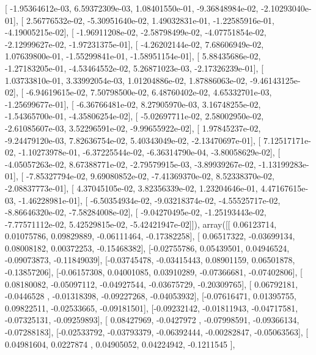 \documentclass{article}
\begin{document}
       [ -1.95364612e-03,   6.59372309e-03,   1.08401550e-01,
         -9.36848984e-02,  -2.10293040e-01],
       [  2.56776532e-02,  -5.30951640e-02,   1.49032831e-01,
         -1.22585916e-01,  -4.19005215e-02],
       [ -1.96911208e-02,  -2.58798499e-02,  -4.07751854e-02,
         -2.12999627e-02,  -1.97231375e-01],
       [ -4.26202144e-02,   7.68606949e-02,   1.07639800e-01,
         -1.55299841e-01,  -1.58951154e-01],
       [  5.88435686e-02,  -1.27183205e-01,  -4.53464552e-02,
          5.26871023e-03,  -2.17326239e-01],
       [  1.03733810e-01,   3.33992054e-03,   1.01204886e-02,
          1.87886063e-02,  -9.46143125e-02],
       [ -6.94619615e-02,   7.50798500e-02,   6.48760402e-02,
          4.65332701e-03,  -1.25699677e-01],
       [ -6.36766481e-02,   8.27905970e-03,   3.16748255e-02,
         -1.54365700e-01,  -4.35806254e-02],
       [ -5.02697711e-02,   2.58002950e-02,  -2.61085607e-03,
          3.52296591e-02,  -9.99655922e-02],
       [  1.97845237e-02,  -9.24479120e-03,   7.82636754e-02,
          5.40343049e-02,  -2.13470697e-01],
       [  7.12517171e-02,  -1.10273978e-01,  -6.37225544e-02,
         -6.36314790e-04,  -3.80058629e-02],
       [ -4.05057263e-02,   8.67388771e-02,  -2.79579915e-03,
         -3.89939267e-02,  -1.13199283e-01],
       [ -7.85327794e-02,   9.69080852e-02,  -7.41369370e-02,
          8.52338370e-02,  -2.08837773e-01],
       [  4.37045105e-02,   3.82356339e-02,   1.23204646e-01,
          4.47167615e-03,  -1.46228981e-01],
       [ -6.50354934e-02,  -9.03218374e-02,  -4.55525717e-02,
         -8.86646320e-02,  -7.58284008e-02],
       [ -9.04270495e-02,  -1.25193443e-02,  -7.77571112e-02,
          5.42529815e-02,  -5.42421947e-02]]), array([[ 0.06123714,  0.01075786,  0.09829889, -0.06111464, -0.17382258],
       [ 0.06517322, -0.03699134,  0.08008182,  0.00372253, -0.15468382],
       [-0.02755786,  0.05439501,  0.04946524, -0.09073873, -0.11849039],
       [-0.03745478, -0.03415443,  0.08901159,  0.06501878, -0.13857206],
       [-0.06157308,  0.04001085,  0.03910289, -0.07366681, -0.07402806],
       [ 0.08180082, -0.05097112, -0.04927544, -0.03675729, -0.20309765],
       [ 0.06792181, -0.0446528 , -0.01318398, -0.09227268, -0.04053932],
       [-0.07616471,  0.01395755,  0.09822511, -0.02533665, -0.09181501],
       [-0.09232142, -0.01811943, -0.04717581, -0.07325131, -0.09259893],
       [ 0.08427969, -0.0427972 , -0.07998591, -0.09366134, -0.07288183],
       [-0.02533792, -0.03793379, -0.06392444, -0.00282847, -0.05063563],
       [ 0.04981604,  0.0227874 ,  0.04905052,  0.04224942, -0.1211545 ],
\end{document}
